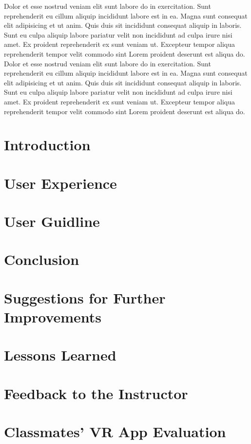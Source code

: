 \documentclass[12pt, twoside]{article}
\begin{document}
Dolor et esse nostrud veniam elit sunt labore do in exercitation. Sunt reprehenderit eu cillum aliquip incididunt labore est in ea. Magna sunt consequat elit adipisicing et ut anim. Quis duis sit incididunt consequat aliquip in laboris. Sunt eu culpa aliquip labore pariatur velit non incididunt ad culpa irure nisi amet. Ex proident reprehenderit ex sunt veniam ut. Excepteur tempor aliqua reprehenderit tempor velit commodo sint Lorem proident deserunt est aliqua do.
Dolor et esse nostrud veniam elit sunt labore do in exercitation. Sunt reprehenderit eu cillum aliquip incididunt labore est in ea. Magna sunt consequat elit adipisicing et ut anim. Quis duis sit incididunt consequat aliquip in laboris. Sunt eu culpa aliquip labore pariatur velit non incididunt ad culpa irure nisi amet. Ex proident reprehenderit ex sunt veniam ut. Excepteur tempor aliqua reprehenderit tempor velit commodo sint Lorem proident deserunt est aliqua do.

\newpage

\section{Introduction}
\section{User Experience}
\section{User Guidline}
\section{Conclusion}
\section{Suggestions for Further Improvements}

\appendix
\section{Lessons Learned}
\section{Feedback to the Instructor}
\section{Classmates' VR App Evaluation}

    
\end{document}
